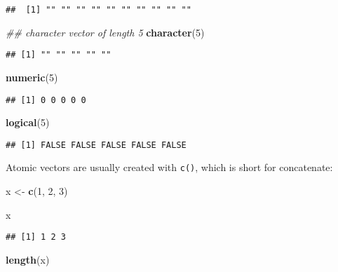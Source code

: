 \documentclass[
]{book}
\newenvironment{Shaded}{\begin{snugshade}}{\end{snugshade}}
\newcommand{\CommentTok}[1]{\textcolor[rgb]{0.56,0.35,0.01}{\textit{#1}}}
\newcommand{\DecValTok}[1]{\textcolor[rgb]{0.00,0.00,0.81}{#1}}
\newcommand{\KeywordTok}[1]{\textcolor[rgb]{0.13,0.29,0.53}{\textbf{#1}}}
\newcommand{\NormalTok}[1]{#1}
\newcommand{\StringTok}[1]{\textcolor[rgb]{0.31,0.60,0.02}{#1}}
\begin{document}
\begin{verbatim}
##  [1] "" "" "" "" "" "" "" "" "" ""
\end{verbatim}

\begin{Shaded}
\begin{Highlighting}[]
\CommentTok{\#\# character vector of length 5}
\KeywordTok{character}\NormalTok{(}\DecValTok{5}\NormalTok{)}
\end{Highlighting}
\end{Shaded}

\begin{verbatim}
## [1] "" "" "" "" ""
\end{verbatim}

\begin{Shaded}
\begin{Highlighting}[]
\KeywordTok{numeric}\NormalTok{(}\DecValTok{5}\NormalTok{)}
\end{Highlighting}
\end{Shaded}

\begin{verbatim}
## [1] 0 0 0 0 0
\end{verbatim}

\begin{Shaded}
\begin{Highlighting}[]
\KeywordTok{logical}\NormalTok{(}\DecValTok{5}\NormalTok{)}
\end{Highlighting}
\end{Shaded}

\begin{verbatim}
## [1] FALSE FALSE FALSE FALSE FALSE
\end{verbatim}

Atomic vectors are usually created with \texttt{c()}, which is short for concatenate:

\begin{Shaded}
\begin{Highlighting}[]
\NormalTok{x \textless{}{-}}\StringTok{ }\KeywordTok{c}\NormalTok{(}\DecValTok{1}\NormalTok{, }\DecValTok{2}\NormalTok{, }\DecValTok{3}\NormalTok{)}

\NormalTok{x}
\end{Highlighting}
\end{Shaded}

\begin{verbatim}
## [1] 1 2 3
\end{verbatim}

\begin{Shaded}
\begin{Highlighting}[]
\KeywordTok{length}\NormalTok{(x)}
\end{Highlighting}
\end{Shaded}
\end{document}
